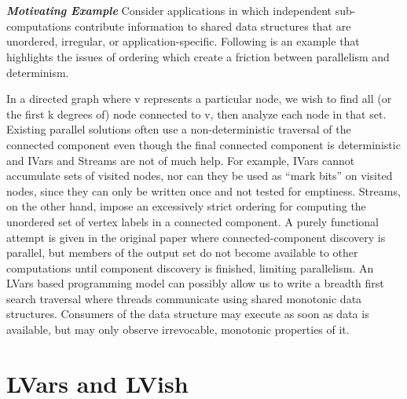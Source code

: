 \documentclass[twocolumn]{article}
\begin{document}
\\ \\ 
\textit{\textbf{Motivating Example}} Consider applications in which independent sub-computations contribute information to shared data structures that are unordered, irregular, or application-specific. Following is an example that highlights the issues of ordering which create a friction between parallelism and determinism. \par 
In a directed graph where v represents a particular node, we wish to find all (or the first k degrees of) node connected to v, then analyze each node in that set. Existing parallel solutions\cite{kuper} often use a non-deterministic traversal of the connected component even though the final connected component is deterministic and IVars and Streams are not of much help. For example, IVars cannot accumulate sets of visited nodes, nor can they be used as “mark bits” on visited nodes, since they can only be written once and not tested for emptiness. Streams, on the other hand, impose an excessively strict ordering for computing the unordered set of vertex labels in a connected component. A purely functional attempt is given in the original paper\cite{lkuper} where connected-component discovery is parallel, but members of the output set do not become available to other computations until component discovery is finished, limiting parallelism. 
An LVars\cite{lkuper} based programming model can possibly allow us to write a breadth first search traversal where threads communicate using shared monotonic data structures. Consumers of the data structure may execute as soon as data is available, but may only observe irrevocable, monotonic properties of it. 

\section{LVars and LVish}
\end{document}

